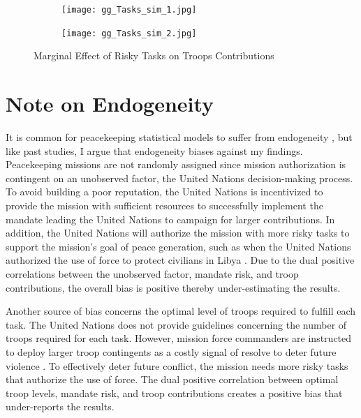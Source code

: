\documentclass[12pt]{article}
\begin{document}
\begin{figure}[t!]
\begin{subfigure}[h]{0.5\linewidth}
\texttt{[image: gg\_Tasks\_sim\_1.jpg]}
\end{subfigure}
\hfill
\begin{subfigure}[h]{0.5\linewidth}
\texttt{[image: gg\_Tasks\_sim\_2.jpg]}
\end{subfigure}
\vspace{-5mm}
\caption{\small Marginal Effect of Risky Tasks on Troops Contributions}
\label{fig:Tasks}
\end{figure}

\section*{Note on Endogeneity}

It is common for peacekeeping statistical models to suffer from endogeneity \citep[Ex.][]{fortna2004,beardsley2011,fjelde2019}, but like past studies, I argue that endogeneity biases against my findings. Peacekeeping missions are not randomly assigned since mission authorization is contingent on an unobserved factor, the United Nations decision-making process. To avoid building a poor reputation, the United Nations is incentivized to provide the mission with sufficient resources to successfully implement the mandate leading the United Nations to campaign for larger contributions. In addition, the United Nations will authorize the mission with more risky tasks to support the mission's goal of peace generation, such as when the United Nations authorized the use of force to protect civilians in Libya \citep{Civs_Libya}. Due to the dual positive correlations between the unobserved factor, mandate risk, and troop contributions, the overall bias is positive thereby under-estimating the results. 

Another source of bias concerns the optimal level of troops required to fulfill each task. The United Nations does not provide guidelines concerning the number of troops required for each task. However, mission force commanders are instructed to deploy larger troop contingents as a costly signal of resolve to deter future violence \citep{fearon1997signaling,Infantry}. To effectively deter future conflict, the mission needs more risky tasks that authorize the use of force. The dual positive correlation between optimal troop levels, mandate risk, and troop contributions creates a positive bias that under-reports the results. 
\end{document}
